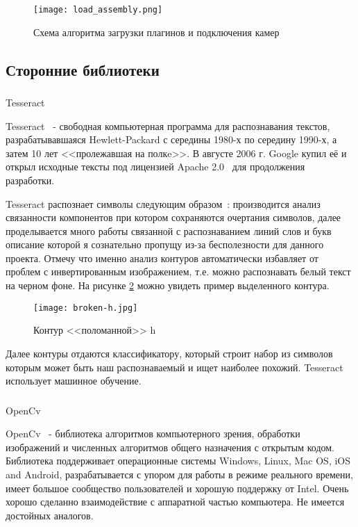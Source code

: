 \begin{figure}[p] 
    \centering
    \texttt{[image: load\_assembly.png]}  
    \caption{Схема алгоритма загрузки плагинов и подключения камер}
    \label{fig:creation:load_assemly}
\end{figure}

\subsection{Сторонние библиотеки}
\subsubsection{}
\label{sub:creation:tesseract}
Tesseract 

Tesseract~\cite{teseract} - свободная компьютерная программа для распознавания текстов, разрабатывавшаяся Hewlett-Packard с середины 1980-х по середину 1990-х, а затем 10 лет <<пролежавшая на полкe>>. В августе 2006 г. Google купил её и открыл исходные тексты под лицензией Apache 2.0~\cite{apache20} для продолжения разработки. 

Tesseract распознает символы следующим образом~\cite{tesseract_owerview}: производится анализ связанности компонентов при котором сохраняются очертания символов, далее проделывается много работы связанной с распознаванием линий слов и букв описание которой я сознательно пропущу из-за бесполезности для данного проекта. Отмечу что именно анализ контуров автоматически избавляет от проблем с инвертированным изображением, т.е. можно распознавать белый текст на черном фоне. На рисунке \ref{fig:domain:recognition:tesseract:hcountor} можно увидеть пример выделенного контура.
\begin{figure}[ht] 
    \centering
    \texttt{[image: broken-h.jpg]}  
    \caption{Контур <<поломанной>> h}
    \label{fig:domain:recognition:tesseract:hcountor}
\end{figure}

Далее контуры отдаются классификатору, который строит набор из символов которым может быть наш распознаваемый и ищет наиболее похожий. Tesseract использует машинное обучение.

\subsubsection{}
OpenCv

OpenCv~\cite{open_cv_en} - библиотека алгоритмов компьютерного зрения, обработки изображений и численных алгоритмов общего назначения с открытым кодом. Библиотека поддерживает операционные системы Windows, Linux, Mac OS, iOS and Android, разрабатывается с упором для работы в режиме реального времени, имеет большое сообщество пользователей и хорошую поддержку от Intel. Очень хорошо сделанно взаимодействие с аппаратной частью компьютера. Не имеется достойных аналогов.

